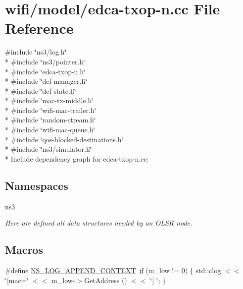 \hypertarget{edca-txop-n_8cc}{}\section{wifi/model/edca-\/txop-\/n.cc File Reference}
\label{edca-txop-n_8cc}
{\ttfamily \#include \char`\"{}ns3/log.\+h\char`\"{}}\\*
{\ttfamily \#include \char`\"{}ns3/pointer.\+h\char`\"{}}\\*
{\ttfamily \#include \char`\"{}edca-\/txop-\/n.\+h\char`\"{}}\\*
{\ttfamily \#include \char`\"{}dcf-\/manager.\+h\char`\"{}}\\*
{\ttfamily \#include \char`\"{}dcf-\/state.\+h\char`\"{}}\\*
{\ttfamily \#include \char`\"{}mac-\/tx-\/middle.\+h\char`\"{}}\\*
{\ttfamily \#include \char`\"{}wifi-\/mac-\/trailer.\+h\char`\"{}}\\*
{\ttfamily \#include \char`\"{}random-\/stream.\+h\char`\"{}}\\*
{\ttfamily \#include \char`\"{}wifi-\/mac-\/queue.\+h\char`\"{}}\\*
{\ttfamily \#include \char`\"{}qos-\/blocked-\/destinations.\+h\char`\"{}}\\*
{\ttfamily \#include \char`\"{}ns3/simulator.\+h\char`\"{}}\\*
Include dependency graph for edca-\/txop-\/n.cc\+:
\subsection*{Namespaces}
\begin{DoxyCompactItemize}
\item 
 \hyperlink{namespacens3}{ns3}
\begin{DoxyCompactList}\small\item\em Here are defined all data structures needed by an O\+L\+SR node. \end{DoxyCompactList}\end{DoxyCompactItemize}
\subsection*{Macros}
\begin{DoxyCompactItemize}
\item 
\#define \hyperlink{edca-txop-n_8cc_abe50035652d407c40bdaef78214c4955}{N\+S\+\_\+\+L\+O\+G\+\_\+\+A\+P\+P\+E\+N\+D\+\_\+\+C\+O\+N\+T\+E\+XT}~\hyperlink{loss__OH__large__cities__urban_8m_ac77b6cfa3068152087725fe54b4ae8c8}{if} (m\+\_\+low != 0) \{ std\+::clog $<$$<$ \char`\"{}\mbox{[}mac=\char`\"{} $<$$<$ m\+\_\+low-\/$>$Get\+Address () $<$$<$ \char`\"{}\mbox{]} \char`\"{}; \}
\end{DoxyCompactItemize}

